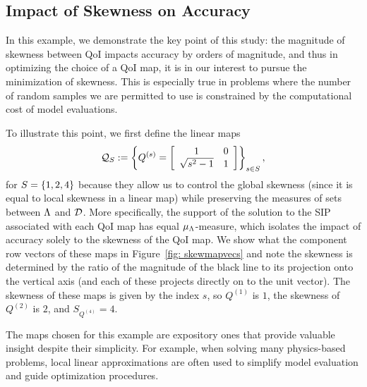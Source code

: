 \subsection{Impact of Skewness on Accuracy}\label{ex:skewness}
In this example, we demonstrate the key point of this study: the magnitude of skewness between QoI impacts accuracy by orders of magnitude, and thus in optimizing the choice of a QoI map, it is in our interest to pursue the minimization of skewness. 
This is especially true in problems where the number of random samples we are permitted to use is constrained by the computational cost of model evaluations.


To illustrate this point, we first define the linear maps 
\begin{equation}\label{eq:qmap2}
\qspace_S := \left \lbrace Q^{(s)} =  \mat{cc}{1 & 0 \\ \sqrt{s^2 - 1}& 1 } \right \rbrace_{s\in S},
\end{equation}
for $S=\set{1,2,4}$ because they allow us to control the global skewness (since it is equal to local skewness in a linear map) while preserving the measures of sets between $\pspace$ and $\dspace$. 
More specifically, the support of the solution to the SIP associated with each QoI map has equal $\mu_\pspace$-measure, which isolates the impact of accuracy solely to the skewness of the QoI map.
We show what the component row vectors of these maps in Figure~\ref{fig: skewmapvecs} and note the skewness is determined by the ratio of the magnitude of the black line to its projection onto the vertical axis (and each of these projects directly on to the unit vector).  
The skewness of these maps is given by the index $s$, so $Q^{(1)}$ is $1$, the skewness of $Q^{(2)}$ is $2$, and $S_{Q^{(4)}} = 4$.

The maps chosen for this example are expository ones that provide valuable insight despite their simplicity. 
For example, when solving many physics-based problems, local linear approximations are often used to simplify model evaluation and guide optimization procedures.


